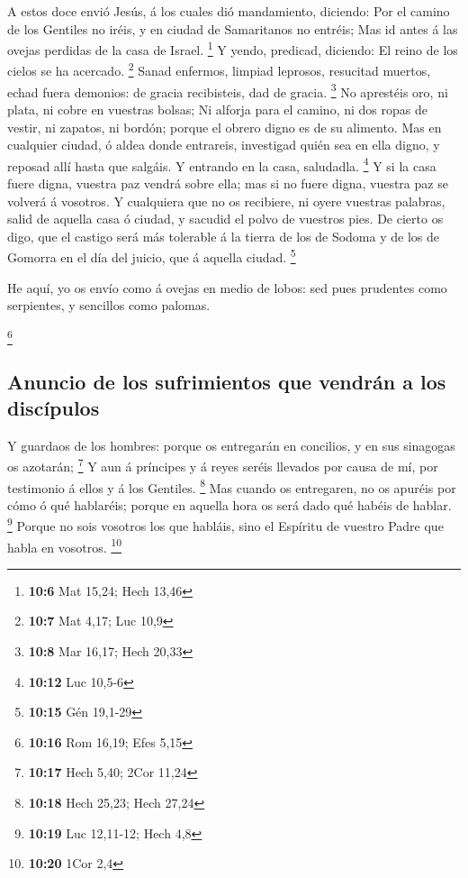  A estos doce envió Jesús, á los cuales dió mandamiento,
diciendo: Por el camino de los Gentiles no iréis, y en ciudad de
Samaritanos no entréis;  Mas id antes á las ovejas
perdidas de la casa de Israel. \footnote{\textbf{10:6} Mat 15,24; Hech
  13,46}  Y yendo, predicad, diciendo: El reino de los
cielos se ha acercado. \footnote{\textbf{10:7} Mat 4,17; Luc 10,9}
 Sanad enfermos, limpiad leprosos, resucitad muertos,
echad fuera demonios: de gracia recibisteis, dad de gracia. \footnote{\textbf{10:8}
  Mar 16,17; Hech 20,33}  No aprestéis oro, ni plata, ni
cobre en vuestras bolsas;  Ni alforja para el camino, ni
dos ropas de vestir, ni zapatos, ni bordón; porque el obrero digno es de
su alimento.  Mas en cualquier ciudad, ó aldea donde
entrareis, investigad quién sea en ella digno, y reposad allí hasta que
salgáis.  Y entrando en la casa, saludadla. \footnote{\textbf{10:12}
  Luc 10,5-6}  Y si la casa fuere digna, vuestra paz
vendrá sobre ella; mas si no fuere digna, vuestra paz se volverá á
vosotros.  Y cualquiera que no os recibiere, ni oyere
vuestras palabras, salid de aquella casa ó ciudad, y sacudid el polvo de
vuestros pies.  De cierto os digo, que el castigo será
más tolerable á la tierra de los de Sodoma y de los de Gomorra en el día
del juicio, que á aquella ciudad. \footnote{\textbf{10:15} Gén 19,1-29}

 He aquí, yo os envío como á ovejas en medio de lobos:
sed pues prudentes como serpientes, y sencillos como palomas.

\footnote{\textbf{10:16} Rom 16,19; Efes 5,15}

\hypertarget{anuncio-de-los-sufrimientos-que-vendruxe1n-a-los-discuxedpulos}{%
\subsection{Anuncio de los sufrimientos que vendrán a los
discípulos}\label{anuncio-de-los-sufrimientos-que-vendruxe1n-a-los-discuxedpulos}}

 Y guardaos de los hombres: porque os entregarán en
concilios, y en sus sinagogas os azotarán; \footnote{\textbf{10:17} Hech
  5,40; 2Cor 11,24}  Y aun á príncipes y á reyes seréis
llevados por causa de mí, por testimonio á ellos y á los Gentiles.
\footnote{\textbf{10:18} Hech 25,23; Hech 27,24}  Mas
cuando os entregaren, no os apuréis por cómo ó qué hablaréis; porque en
aquella hora os será dado qué habéis de hablar. \footnote{\textbf{10:19}
  Luc 12,11-12; Hech 4,8}  Porque no sois vosotros los
que habláis, sino el Espíritu de vuestro Padre que habla en vosotros.
\footnote{\textbf{10:20} 1Cor 2,4}

